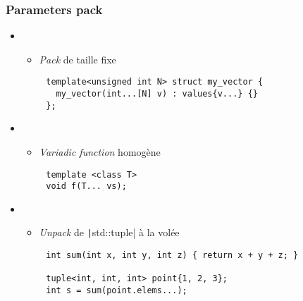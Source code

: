 \documentclass[C++.tex]{subfiles}
\begin{document}
\begin{frame}[fragile]
	\frametitle{Parameters pack}
	\begin{itemize}
		\item []
		\begin{itemize}
			\item \textit{Pack} de taille fixe
		\end{itemize}
	\end{itemize}

	\begin{verbatim}
		template<unsigned int N> struct my_vector {
		  my_vector(int...[N] v) : values{v...} {}
		};
	\end{verbatim}

	\begin{itemize}
		\item []
		\begin{itemize}
			\item \textit{Variadic function} homogène
		\end{itemize}
	\end{itemize}

	\begin{verbatim}
		template <class T>
		void f(T... vs);
	\end{verbatim}


	\begin{itemize}
		\item []
		\begin{itemize}
			\item \textit{Unpack} de \texttt|std::tuple| à la volée
		\end{itemize}
	\end{itemize}

	\begin{verbatim}
		int sum(int x, int y, int z) { return x + y + z; }

		tuple<int, int, int> point{1, 2, 3};
		int s = sum(point.elems...);
	\end{verbatim}
\end{frame}
\end{document}
